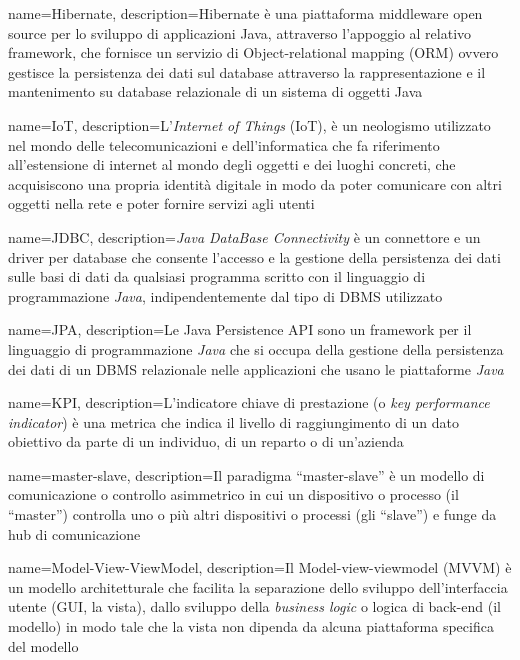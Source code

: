 {
    name=Hibernate,
    description={Hibernate è una piattaforma middleware open source per lo sviluppo di applicazioni Java, attraverso l'appoggio al relativo framework, che fornisce un servizio di Object-relational mapping (ORM) ovvero gestisce la persistenza dei dati sul database attraverso la rappresentazione e il mantenimento su database relazionale di un sistema di oggetti Java}
}

{
    name=IoT,
    description={L'\textit{Internet of Things} (IoT), è un neologismo utilizzato nel mondo delle telecomunicazioni e dell'informatica che fa riferimento all'estensione di internet al mondo degli oggetti e dei luoghi concreti, che acquisiscono una propria identità digitale in modo da poter comunicare con altri oggetti nella rete e poter fornire servizi agli utenti}
}

{
    name=JDBC,
    description={\textit{Java DataBase Connectivity} è un connettore e un driver per database che consente l'accesso e la gestione della persistenza dei dati sulle basi di dati da qualsiasi programma scritto con il linguaggio di programmazione \textit{Java}, indipendentemente dal tipo di DBMS utilizzato}
}

{
    name=JPA,
    description={Le Java Persistence API sono un framework per il linguaggio di programmazione \textit{Java} che si occupa della gestione della persistenza dei dati di un DBMS relazionale nelle applicazioni che usano le piattaforme \textit{Java}}
}

{
    name=KPI,
    description={L’indicatore chiave di prestazione (o \textit{key performance indicator}) è una metrica che indica il livello di raggiungimento di un dato obiettivo da parte di un individuo, di un reparto o di un’azienda}
}

{
    name=master-slave,
    description={Il paradigma ``master-slave'' è un modello di comunicazione o controllo asimmetrico in cui un dispositivo o processo (il ``master'') controlla uno o più altri dispositivi o processi (gli ``slave'') e funge da hub di comunicazione}
}

{
    name=Model-View-ViewModel,
    description={Il Model-view-viewmodel (MVVM) è un modello architetturale che facilita la separazione dello sviluppo dell'interfaccia utente (GUI, la vista), dallo sviluppo della \textit{business logic} o logica di back-end (il modello) in modo tale che la vista non dipenda da alcuna piattaforma specifica del modello}
}

